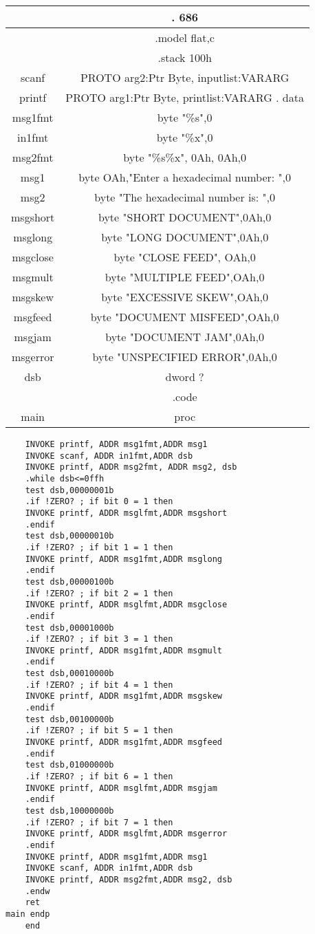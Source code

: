 \documentclass[10pt]{article}
\begin{document}
\begin{center}
\begin{tabular}{|c|c|}
\hline
 & . 686 \\
\hline
 & .model flat,c \\
\hline
 & .stack 100h \\
\hline
scanf & PROTO arg2:Ptr Byte, inputlist:VARARG \\
\hline
printf & PROTO arg1:Ptr Byte, printlist:VARARG . data \\
\hline
msg1fmt & byte "\%s",0 \\
\hline
in1fmt & byte "\%x",0 \\
\hline
msg2fmt & byte "\%s\%x", 0Ah, 0Ah,0 \\
\hline
msg1 & byte OAh,"Enter a hexadecimal number: ",0 \\
\hline
msg2 & byte "The hexadecimal number is: ",0 \\
\hline
msgshort & byte "SHORT DOCUMENT",0Ah,0 \\
\hline
msglong & byte "LONG DOCUMENT",0Ah,0 \\
\hline
msgclose & byte "CLOSE FEED", OAh,0 \\
\hline
msgmult & byte "MULTIPLE FEED",OAh,0 \\
\hline
msgskew & byte "EXCESSIVE SKEW",OAh,0 \\
\hline
msgfeed & byte "DOCUMENT MISFEED",OAh,0 \\
\hline
msgjam & byte "DOCUMENT JAM",0Ah,0 \\
\hline
msgerror & byte "UNSPECIFIED ERROR",0Ah,0 \\
\hline
dsb & dword ? \\
\hline
 & .code \\
\hline
main & proc \\
\hline
\end{tabular}
\end{center}

\begin{verbatim}
    INVOKE printf, ADDR msg1fmt,ADDR msg1
    INVOKE scanf, ADDR in1fmt,ADDR dsb
    INVOKE printf, ADDR msg2fmt, ADDR msg2, dsb
    .while dsb<=0ffh
    test dsb,00000001b
    .if !ZERO? ; if bit 0 = 1 then
    INVOKE printf, ADDR msglfmt,ADDR msgshort
    .endif
    test dsb,00000010b
    .if !ZERO? ; if bit 1 = 1 then
    INVOKE printf, ADDR msg1fmt,ADDR msglong
    .endif
    test dsb,00000100b
    .if !ZERO? ; if bit 2 = 1 then
    INVOKE printf, ADDR msglfmt,ADDR msgclose
    .endif
    test dsb,00001000b
    .if !ZERO? ; if bit 3 = 1 then
    INVOKE printf, ADDR msg1fmt,ADDR msgmult
    .endif
    test dsb,00010000b
    .if !ZERO? ; if bit 4 = 1 then
    INVOKE printf, ADDR msg1fmt,ADDR msgskew
    .endif
    test dsb,00100000b
    .if !ZERO? ; if bit 5 = 1 then
    INVOKE printf, ADDR msg1fmt,ADDR msgfeed
    .endif
    test dsb,01000000b
    .if !ZERO? ; if bit 6 = 1 then
    INVOKE printf, ADDR msglfmt,ADDR msgjam
    .endif
    test dsb,10000000b
    .if !ZERO? ; if bit 7 = 1 then
    INVOKE printf, ADDR msglfmt,ADDR msgerror
    .endif
    INVOKE printf, ADDR msg1fmt,ADDR msg1
    INVOKE scanf, ADDR in1fmt,ADDR dsb
    INVOKE printf, ADDR msg2fmt,ADDR msg2, dsb
    .endw
    ret
main endp
    end
\end{verbatim}
\end{document}
